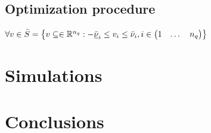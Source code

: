 \documentclass{article}
\begin{document}
\subsection{Optimization procedure}
$ \forall v \in \bar{S} = \left\{ v\subseteq  \in  {\mathbb{R}}^{n_q} : - \underline{\bar{\nu}}_i \leq v_i \leq \bar{\nu}_i, i \in \left(\begin{matrix}1 & \dots & n_q\end{matrix}\right) \right\} $

\section{Simulations}

\section{Conclusions}

\printbibliography
\end{document}
